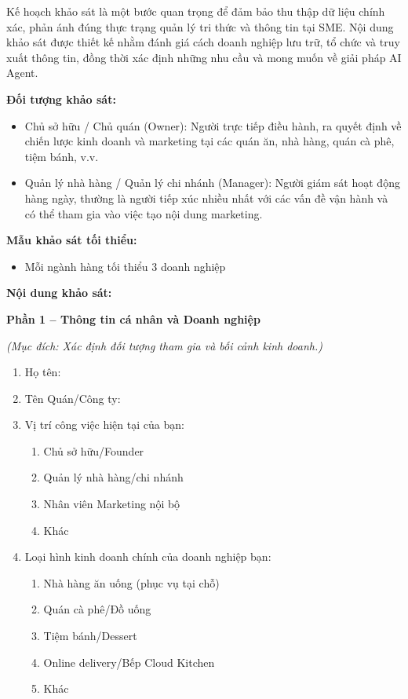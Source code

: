 Kế hoạch khảo sát là một bước quan trọng để đảm bảo thu thập dữ liệu
chính xác, phản ánh đúng thực trạng quản lý tri thức và thông tin tại
SME. Nội dung khảo sát được thiết kế nhằm đánh giá cách doanh nghiệp lưu
trữ, tổ chức và truy xuất thông tin, đồng thời xác định những nhu cầu và
mong muốn về giải pháp AI Agent.

\textbf{Đối tượng khảo sát:}

\begin{itemize}
\item
  Chủ sở hữu / Chủ quán (Owner): Người trực tiếp điều hành, ra quyết
  định về chiến lược kinh doanh và marketing tại các quán ăn, nhà hàng,
  quán cà phê, tiệm bánh, v.v.
\item
  Quản lý nhà hàng / Quản lý chi nhánh (Manager): Người giám sát hoạt
  động hàng ngày, thường là người tiếp xúc nhiều nhất với các vấn đề vận
  hành và có thể tham gia vào việc tạo nội dung marketing.
\end{itemize}

\textbf{Mẫu khảo sát tối thiểu:}

\begin{itemize}
\item
  Mỗi ngành hàng tối thiểu 3 doanh nghiệp
\end{itemize}

\textbf{Nội dung khảo sát:}

\textbf{Phần 1 -- Thông tin cá nhân và Doanh nghiệp}

\emph{(Mục đích: Xác định đối tượng tham gia và bối cảnh kinh doanh.)}

\begin{enumerate}
\def\labelenumi{\arabic{enumi}.}
\item
  Họ tên:
\item
  Tên Quán/Công ty:
\item
  Vị trí công việc hiện tại của bạn:

  \begin{enumerate}
  \def\labelenumii{\arabic{enumii}.}
  \item
    Chủ sở hữu/Founder
  \item
    Quản lý nhà hàng/chi nhánh
  \item
    Nhân viên Marketing nội bộ
  \item
    Khác
  \end{enumerate}
\item
  Loại hình kinh doanh chính của doanh nghiệp bạn:

  \begin{enumerate}
  \def\labelenumii{\arabic{enumii}.}
  \item
    Nhà hàng ăn uống (phục vụ tại chỗ)
  \item
    Quán cà phê/Đồ uống
  \item
    Tiệm bánh/Dessert
  \item
    Online delivery/Bếp Cloud Kitchen
  \item
    Khác
  \end{enumerate}
\end{enumerate}

